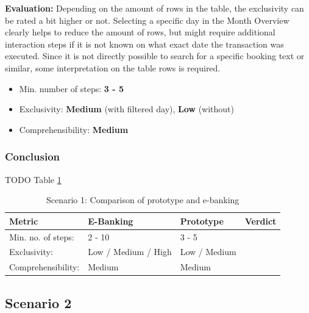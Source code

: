 \textbf{Evaluation:} Depending on the amount of rows in the table, the exclusivity can be rated a bit higher or not. Selecting a specific day in the Month Overview clearly helps to reduce the amount of rows, but might require additional interaction steps if it is not known on what exact date the transaction was executed. Since it is not directly possible to search for a specific booking text or similar, some interpretation on the table rows is required.
\begin{itemize}[noitemsep,nolistsep]
	\item Min. number of steps: \textbf{3 - 5}
	\item Exclusivity: \textbf{Medium} (with filtered day), \textbf{Low} (without)
	\item Comprehensibility: \textbf{Medium}
\end{itemize}



\subsubsection{Conclusion}

TODO Table \ref{tbl:scenarioonecomparison}

\begin{table}[h]
	\begin{center}
		\begin{tabular}{ | p{3.2cm} | p{3.8cm} | p{3.5cm} | p{2.5cm} | }
			\hline
			\textbf{Metric} & \textbf{E-Banking} & \textbf{Prototype} & \textbf{Verdict} \\
			\hline
				Min. no. of steps: & 2 - 10 & 3 - 5 &  \\
			\hline
				Exclusivity: & Low / Medium / High & Low / Medium &  \\
			\hline
				Comprehensibility: & Medium & Medium &  \\
			\hline
		\end{tabular}
		\caption{Scenario 1: Comparison of prototype and e-banking}
		\label{tbl:scenarioonecomparison}
	\end{center}
\end{table}



\subsection{Scenario 2}


